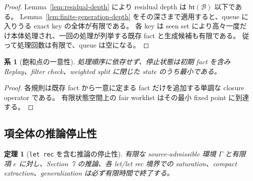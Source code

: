 \documentclass[uplatex,dvipdfmx,a4paper,10.5pt]{jsarticle}
\theoremstyle{jpplain}
\newtheorem{theorem}[definition]{定理}
\newtheorem{corollary}[definition]{系}
\newcommand{\Caps}{\mathcal B}
\newcommand{\height}{\mathsf{ht}}
\begin{document}
\begin{proof}
Lemma~\ref{lem:residual-depth} により residual depth は $\height(\Caps)$ 以下である。
Lemma~\ref{lem:finite-generation-depth} をその深さまで適用すると、queue に入りうる exact key の全体が有限である。
各 key は seen set により高々一度だけ本体処理され、一回の処理が列挙する既存 fact と生成候補も有限である。
従って処理回数は有限で、queue は空になる。
\end{proof}

\begin{corollary}[飽和点の一意性]\label{cor:unique-saturation}
処理順序に依存せず、停止状態は初期 fact を含み Replay、filter check、weighted split に閉じた state のうち最小である。
\end{corollary}

\begin{proof}
各規則は既存 fact から一意に定まる fact だけを追加する単調な closure operator である。
有限状態空間上の fair worklist はその最小 fixed point に到達する。
\end{proof}

\subsection{項全体の推論停止性}

\begin{theorem}[\texttt{let rec} を含む推論の停止性]\label{thm:inference-termination}
有限な source-admissible 環境 $\Gamma$ と有限項 $e$ に対し、Section~7 の推論、各 let/let rec 境界での saturation、compact extraction、generalization は必ず有限時間で終了する。
\end{theorem}
\end{document}
